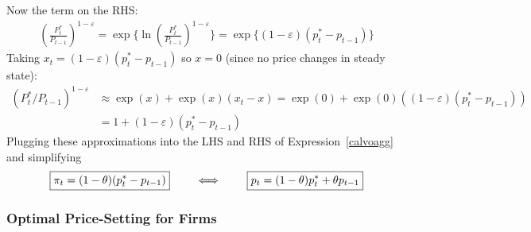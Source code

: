 \documentclass[12pt]{article}
\theoremstyle{plain}
\theoremstyle{definition}
\theoremstyle{remark}
\begin{document}
Now the term on the RHS:
\begin{align*}
  \left(\frac{P_t^*}{P_{t-1}}\right)^{1-\varepsilon}
  = \exp\bigg\{
    \ln \left(\frac{P_t^*}{P_{t-1}}\right)^{1-\varepsilon}
    \bigg\}
  = \exp\big\{
    (1-\varepsilon)(p_t^*-p_{t-1})
    \big\}
\end{align*}
Taking $x_t=(1-\varepsilon)(p_t^*-p_{t-1})$ so
$x=0$ (since no price changes in steady state):
\begin{align*}
  \left(P_t^*/P_{t-1}\right)^{1-\varepsilon}
  &\approx
  \exp(x) + \exp(x)(x_t-x)
  = \exp(0) + \exp(0)
    ((1-\varepsilon)(p_t^*-p_{t-1}))
  \\
  &= 1 + (1-\varepsilon)(p_t^*-p_{t-1})
\end{align*}
Plugging these approximations into the LHS and RHS of
Expression~\ref{calvoagg} and simplifying
\begin{align*}
  \boxed{%
  \pi_t = (1-\theta)(p_t^*-p_{t-1})
  }
  \qquad\iff\qquad
  \boxed{%
  p_t  =
    (1-\theta)p_t^*
    + \theta p_{t-1}
  }
\end{align*}


\subsubsection{Optimal Price-Setting for Firms}
\end{document}
